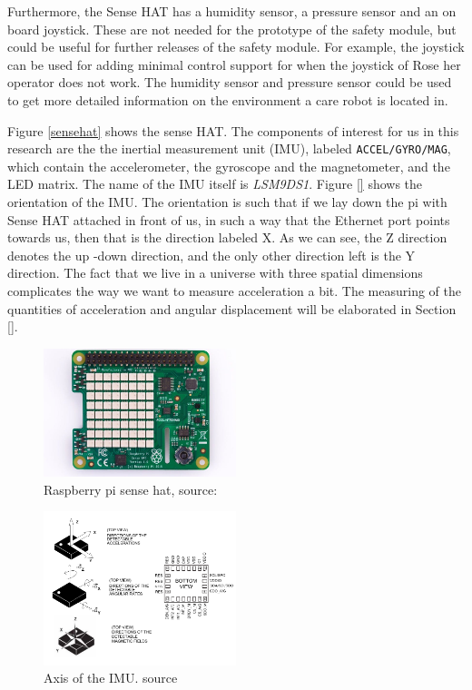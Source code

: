 \documentclass[12pt]{scrreprt}
\begin{document}
Furthermore, the Sense HAT has a humidity sensor, a  pressure sensor and an on board joystick. These are not needed for the prototype of the safety module, but could be useful for further releases of the safety module. For example, the joystick can be used for adding minimal control support for when the joystick of Rose her operator does not work. The humidity sensor and pressure sensor could be used to get more detailed information on the environment a care robot is located in.
\par
Figure \ref{sensehat} shows the sense HAT. The components of interest for us in this research are the the inertial measurement unit (IMU), labeled \texttt{ACCEL/GYRO/MAG}, which contain the accelerometer, the gyroscope and the magnetometer, and the LED matrix. The name of the IMU itself is \textit{LSM9DS1}. Figure \ref{} shows the orientation of the IMU. The orientation is such that if we lay down the \gls{pi} with Sense HAT attached in front of us, in such a way that the Ethernet port points towards us, then that is the direction labeled X. As we can see, the Z direction denotes the up -down direction, and the only other direction left is the Y direction. The fact that we live in a universe with three spatial dimensions complicates the way we want to measure acceleration a bit. The measuring of the quantities of acceleration and angular displacement will be elaborated in Section \ref{}.

\begin{figure}[H]
    \centering
    \includegraphics[width=0.5\textwidth]{Figures/results/sense_hat_correct.jpg}
    \caption{Raspberry pi sense hat, source: \cite{sensehat}}
    \label{fig:sensehat}
\end{figure}

\begin{figure}[H]
    \centering
    \includegraphics[width=0.5\textwidth]{Figures/results/imu_orientation.png}
    \caption{Axis of the IMU. source \cite{lsm9ds1}}
    \label{fig:imu_orientation}
\end{figure}
\end{document}
